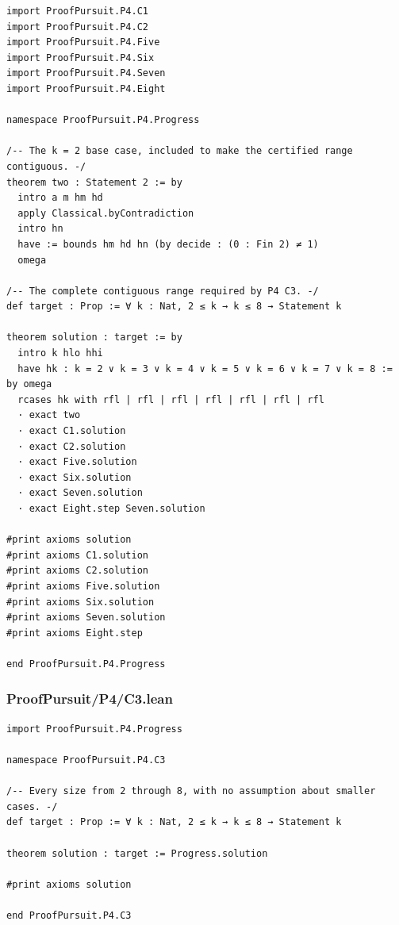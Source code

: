 \documentclass[11pt,a4paper]{article}
\begin{document}
\begin{Verbatim}[breaklines,breakanywhere,fontsize=\footnotesize]
import ProofPursuit.P4.C1
import ProofPursuit.P4.C2
import ProofPursuit.P4.Five
import ProofPursuit.P4.Six
import ProofPursuit.P4.Seven
import ProofPursuit.P4.Eight

namespace ProofPursuit.P4.Progress

/-- The k = 2 base case, included to make the certified range contiguous. -/
theorem two : Statement 2 := by
  intro a m hm hd
  apply Classical.byContradiction
  intro hn
  have := bounds hm hd hn (by decide : (0 : Fin 2) ≠ 1)
  omega

/-- The complete contiguous range required by P4 C3. -/
def target : Prop := ∀ k : Nat, 2 ≤ k → k ≤ 8 → Statement k

theorem solution : target := by
  intro k hlo hhi
  have hk : k = 2 ∨ k = 3 ∨ k = 4 ∨ k = 5 ∨ k = 6 ∨ k = 7 ∨ k = 8 := by omega
  rcases hk with rfl | rfl | rfl | rfl | rfl | rfl | rfl
  · exact two
  · exact C1.solution
  · exact C2.solution
  · exact Five.solution
  · exact Six.solution
  · exact Seven.solution
  · exact Eight.step Seven.solution

#print axioms solution
#print axioms C1.solution
#print axioms C2.solution
#print axioms Five.solution
#print axioms Six.solution
#print axioms Seven.solution
#print axioms Eight.step

end ProofPursuit.P4.Progress
\end{Verbatim}

\subsubsection{ProofPursuit/P4/C3.lean}\label{proofpursuitp4c3.lean}

\begin{Verbatim}[breaklines,breakanywhere,fontsize=\footnotesize]
import ProofPursuit.P4.Progress

namespace ProofPursuit.P4.C3

/-- Every size from 2 through 8, with no assumption about smaller cases. -/
def target : Prop := ∀ k : Nat, 2 ≤ k → k ≤ 8 → Statement k

theorem solution : target := Progress.solution

#print axioms solution

end ProofPursuit.P4.C3
\end{Verbatim}
\end{document}
